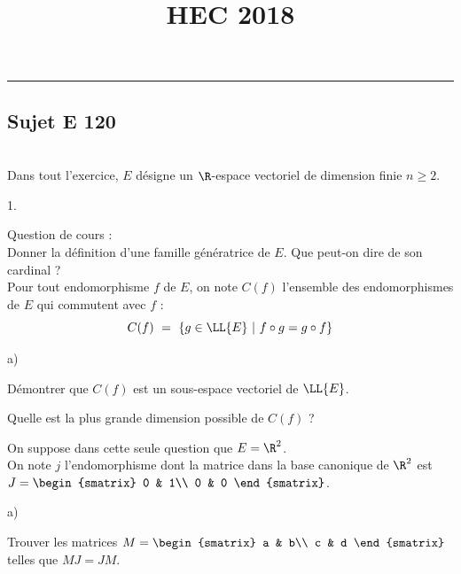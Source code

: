 \documentclass[11pt]{article}%
\title{\bf \vspace{-1.6cm} HEC 2018} %
\author{} %
\date{} %
\begin{document}
\maketitle %
\vspace{-1.2cm}\hrule %
\thispagestyle{fancy}

\vspace*{.2cm}


\subsection*{Sujet E 120}

\begin{exerciceAP}~\\
  Dans tout l'exercice, $E$ désigne un $\R$-espace vectoriel de
  dimension finie $n \geq 2$.
  \begin{noliste}{1.}
    \setlength{\itemsep}{2mm}
  \item Question de cours :\\
    Donner la définition d'une famille génératrice
    de $E$. Que peut-on dire de son cardinal ?\\[.4cm]
    Pour tout endomorphisme $f$ de $E$, on note $C(f)$ l'ensemble des
    endomorphismes de $E$ qui commutent avec $f$ :
    \[
    C(f) \ = \ \{ g \in \LL{E} \ | \ f \circ g = g \circ f \}
    \]
    
  \item    
    \begin{noliste}{a)}
    \setlength{\itemsep}{2mm}
  \item Démontrer que $C(f)$ est un sous-espace vectoriel de $\LL{E}$.
      
    \item Quelle est la plus grande dimension possible de $C(f)$ ?
    \end{noliste}
    
  \item On suppose dans cette seule question que $E=\R^2$.\\
    On note $j$ l'endomorphisme dont la matrice dans la base canonique
    de $\R^2$ est $J = 
    \begin{smatrix}
      0 & 1\\
      0 & 0
    \end{smatrix}$.
    \begin{noliste}{a)}
    \setlength{\itemsep}{2mm}
    \item Trouver les matrices $M=
      \begin{smatrix}
        a & b\\
        c & d
      \end{smatrix}$
      telles que $MJ = JM$.
      

\end{noliste}
\end{noliste}
\end{exerciceAP}
\end{document}
